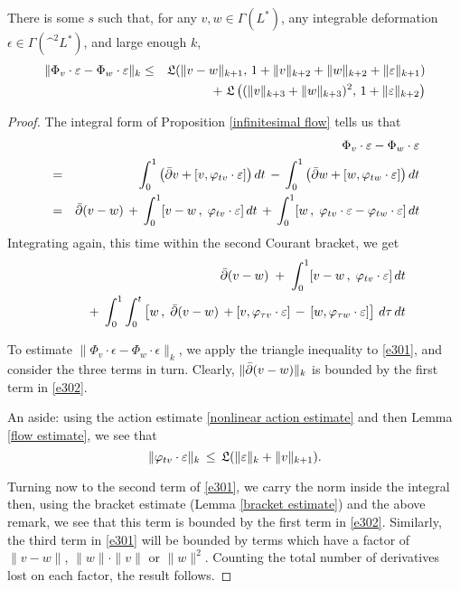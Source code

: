 \documentclass{article}
\begin{document}
\begin{lem}
There is some $s$ such that, for any $v,w \in \Gamma(L^*)$, any integrable deformation $\epsilon \in \Gamma(\^ ^2 L^*)$, and large enough $k$,
\begin{eqnarray}
\|\Phi_v\cdot \epsilon - \Phi_w\cdot\epsilon\|_k &\leq& \LP(\|v - w\|_{k+1},\, 1 + \|v\|_{k+2} + \|w\|_{k+2}+\|\epsilon\|_{k+1}) \notag \\
& & \;+\; \LP\left((\|v\|_{k+3} + \|w\|_{k+3})^2,\, 1+\|\epsilon\|_{k+2}\right) \label{e302}
\end{eqnarray}
\end{lem}
\begin{proof}
The integral form of Proposition \ref{infinitesimal flow} tells us that
\begin{eqnarray*}
& &\Phi_v \cdot \varepsilon - \Phi_w \cdot \varepsilon \\
&=& \int_0^1 \left(\bar{\partial} v + [v,\varphi_{tv}\cdot\varepsilon]\right)dt \,-\, \int_0^1 \left(\bar{\partial} w + [w,\varphi_{tw}\cdot\varepsilon]\right)dt \notag \\
&=& \bar{\partial}(v-w) \,+\, \int_0^1 [v-w\,,\;\varphi_{tv}\cdot\varepsilon]\,dt
\,+\, \int_0^1 [w\,,\;\varphi_{tv}\cdot\varepsilon-\varphi_{tw}\cdot\varepsilon]\,dt \\
\end{eqnarray*}
Integrating again, this time within the second Courant bracket, we get
\begin{eqnarray}
& & \bar\del(v-w) \;+\; \int_0^1 [v-w\,,\;\phi_{tv}\cdot\epsilon]\,dt \label{e301} \\
& & \quad +\; \int_0^1 \int_0^t \left[w\,,\; \bar\del(v-w)\, + [v,\phi_{\tau v}\cdot\epsilon] \,-\, [w,\phi_{\tau w}\cdot\epsilon]\right]\,d\tau\,dt \notag
\end{eqnarray}

To estimate $\|\Phi_v\cdot \epsilon - \Phi_w\cdot \epsilon\|_k$, we apply the triangle inequality to \eqref{e301}, and consider the three terms in turn.  Clearly, $\|\bar{\partial}(v-w)\|_k$ is bounded by the first term in \eqref{e302}.

An aside: using the action estimate \eqref{nonlinear action estimate} and then Lemma \ref{flow estimate}, we see that
$$\|\varphi_{tv}\cdot\varepsilon\|_k \,\leq\, \mathfrak{L}(\|\varepsilon\|_k + \|v\|_{k+1}).$$

Turning now to the second term of \eqref{e301}, we carry the norm inside the integral then, using the bracket estimate (Lemma \ref{bracket estimate}) and the above remark, we see that this term is bounded by the first term in \eqref{e302}.  Similarly, the third term in \eqref{e301} will be bounded by terms which have a factor of $\|v-w\|$, $\|w\|\cdot\|v\|$ or $\|w\|^2$.  Counting the total number of derivatives lost on each factor, the result follows.
\end{proof}
\end{document}

